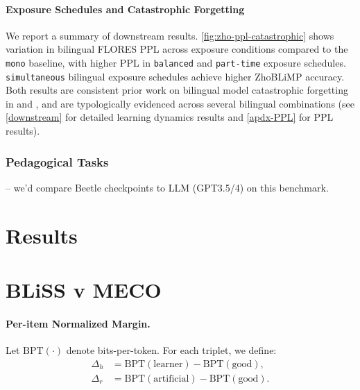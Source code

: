 \paragraph{Exposure Schedules and Catastrophic Forgetting} We report a summary of downstream results. \autoref{fig:zho-ppl-catastrophic} shows variation in bilingual FLORES PPL across exposure conditions compared to the \texttt{mono} baseline, with higher PPL in \texttt{balanced} and \texttt{part-time} exposure schedules. \texttt{simultaneous} bilingual exposure schedules achieve higher ZhoBLiMP accuracy. Both results are consistent prior work on bilingual model catastrophic forgetting in \citet{arnett-etal-2025-acquisition} and \citet{Salhan2026}, and are typologically evidenced across several bilingual combinations (see \autoref{downstream} for detailed learning dynamics results and \autoref{apdx-PPL} for PPL results).

\subsubsection{Pedagogical Tasks}  – we'd compare Beetle checkpoints to LLM (GPT3.5/4) on this benchmark. 

\section{Results}



\section{BLiSS v MECO}
\paragraph{Per-item Normalized Margin.}
Let $\mathrm{BPT}(\cdot)$ denote bits-per-token. For each triplet, we define:
\begin{align}
\Delta_h &= \mathrm{BPT}(\text{learner}) - \mathrm{BPT}(\text{good}), \\
\Delta_r &= \mathrm{BPT}(\text{artificial}) - \mathrm{BPT}(\text{good}).
\end{align}

